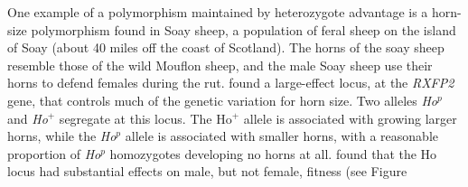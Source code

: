 One example of a polymorphism maintained by heterozygote advantage is
a horn-size polymorphism found in Soay sheep, a population of feral sheep on the island of Soay
(about 40 miles off the coast of Scotland).  The horns of the soay sheep resemble
those of the wild Mouflon sheep, and the male Soay sheep use their horns to defend females during
the rut. \citet{johnston2013life} found a large-effect locus,  at the
{\it RXFP2} gene, that controls much of the genetic variation for horn size. Two
alleles {\it Ho$^p$} and {\it Ho$^+$} segregate at this locus. The Ho$^+$ allele is associated with
growing larger horns, while the {\it Ho$^p$} allele is associated with smaller
horns, with a reasonable proportion of {\it Ho$^p$} homozygotes developing no
horns at all. \citet{johnston2013life} found that the Ho locus had substantial
effects on male, but not female, fitness (see Figure
